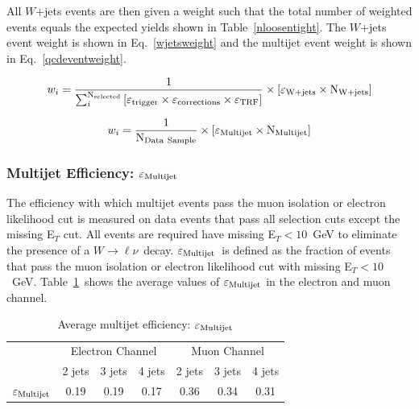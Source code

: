 All $W$+jets events are then given a weight such that the total number of weighted events equals the expected yields shown in Table~\ref{nloosentight}. The $W$+jets event weight is shown in Eq.~\ref{wjetsweight} and the multijet event weight is shown in Eq.~\ref{qcdeventweight}.

\begin{equation}
\label{wjetsweight}
w_{i} = \frac{1}{\sum_{i}^{\rm{N}_{\rm selected}} \left[ \varepsilon_{\rm trigger} \times
\varepsilon_{\rm corrections} \times \varepsilon_{\rm TRF} \right]} \times \left[ \varepsilon_{\rm{W+jets}}\times \rm{N}_{\rm{W+jets}} \right]
\end{equation}

\begin{equation}
\label{qcdeventweight}
w_{i} = \frac{1}{\rm{N_{Data~Sample}}} \times \left[ \varepsilon_{\rm{Multijet}}\times \rm{N}_{\rm{Multijet}} \right]
\end{equation}


\subsubsection{Multijet Efficiency: $\varepsilon_{\rm{Multijet}}$ }

The efficiency with which multijet events pass the muon isolation or electron likelihood cut is measured on data events that pass all selection cuts except the missing E$_{T}$ cut. All events are required have missing E$_{T}<10$~GeV to eliminate the presence of a $W\rightarrow \ell \nu$~decay. $\varepsilon_{\rm{Multijet}}$~is defined as the fraction of events that pass the muon isolation or electron likelihood cut with missing E$_{T}<10$~GeV. Table~\ref{epsilonqcd}~shows the average values of $\varepsilon_{\rm{Multijet}}$ in the electron and muon channel.

\vspace{0.2in}
\begin{table}[!h!tbp]
\begin{center}
\caption{Average multijet efficiency: $\varepsilon_{\rm{Multijet}}$}
\label{epsilonqcd}
\begin{tabular}{c|ccc|ccc}
& \multicolumn{3}{c|}{Electron Channel} & \multicolumn{3}{c}{Muon Channel}    \\
                               & 2 jets & 3 jets & 4 jets
                               & 2 jets & 3 jets & 4 jets \\
\hline
$\varepsilon_{\rm{Multijet}}$   &   0.19 &   0.19 &   0.17 &  0.36 &   0.34 &  0.31
\end{tabular}
\vspace{-0.1in}
\end{center}
\end{table}

